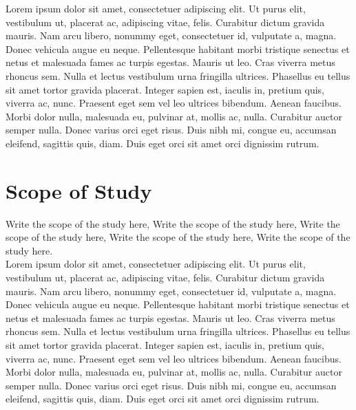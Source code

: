 Lorem ipsum dolor sit amet, consectetuer adipiscing elit. Ut purus elit, vestibulum
ut, placerat ac, adipiscing vitae, felis. Curabitur dictum gravida mauris. Nam arcu libero, nonummy eget, consectetuer id, vulputate a, magna. Donec vehicula augue eu neque. Pellentesque habitant morbi tristique senectus et netus et malesuada fames ac turpis egestas. Mauris ut leo. Cras viverra metus rhoncus sem. Nulla et lectus vestibulum urna fringilla ultrices. Phasellus eu tellus sit amet tortor gravida placerat. Integer sapien est, iaculis in, pretium quis, viverra ac, nunc. Praesent eget sem vel leo ultrices bibendum. Aenean faucibus. Morbi dolor nulla, malesuada eu, pulvinar at, mollis ac, nulla. Curabitur auctor semper nulla. Donec varius orci eget risus. Duis nibh mi, congue eu, accumsan eleifend, sagittis quis, diam. Duis eget orci sit amet orci dignissim rutrum.

\section{Scope of Study}

Write the scope of the study here, Write the scope of the study here, Write the scope of the study here, Write the scope of the study here, Write the scope of the study here. \\

Lorem ipsum dolor sit amet, consectetuer adipiscing elit. Ut purus elit, vestibulum
ut, placerat ac, adipiscing vitae, felis. Curabitur dictum gravida mauris. Nam arcu libero, nonummy eget, consectetuer id, vulputate a, magna. Donec vehicula augue eu neque. Pellentesque habitant morbi tristique senectus et netus et malesuada fames ac turpis egestas. Mauris ut leo. Cras viverra metus rhoncus sem. Nulla et lectus vestibulum urna fringilla ultrices. Phasellus eu tellus sit amet tortor gravida placerat. Integer sapien est, iaculis in, pretium quis, viverra ac, nunc. Praesent eget sem vel leo ultrices bibendum. Aenean faucibus. Morbi dolor nulla, malesuada eu, pulvinar at, mollis ac, nulla. Curabitur auctor semper nulla. Donec varius orci eget risus. Duis nibh mi, congue eu, accumsan eleifend, sagittis quis, diam. Duis eget orci sit amet orci dignissim rutrum.
